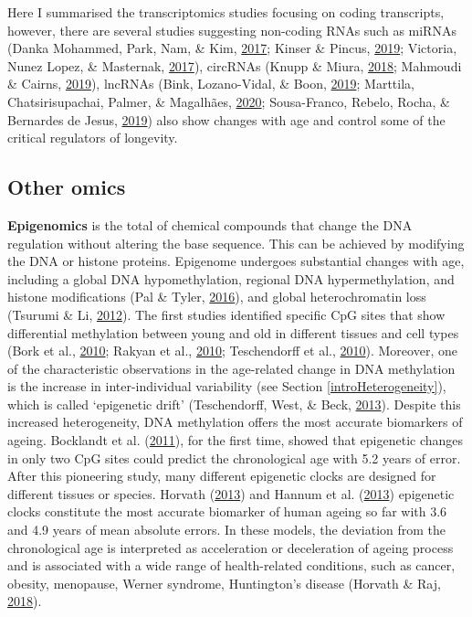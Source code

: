 \documentclass[12pt,twoside]{unicam}
\begin{document}
Here I summarised the transcriptomics studies focusing on coding transcripts, however, there are several studies suggesting non-coding RNAs such as miRNAs (Danka Mohammed, Park, Nam, \& Kim, \protect\hyperlink{ref-DankaMohammed2017}{2017}; Kinser \& Pincus, \protect\hyperlink{ref-Kinser2019}{2019}; Victoria, Nunez Lopez, \& Masternak, \protect\hyperlink{ref-Victoria2017}{2017}), circRNAs (Knupp \& Miura, \protect\hyperlink{ref-Knupp2018}{2018}; Mahmoudi \& Cairns, \protect\hyperlink{ref-Mahmoudi2019}{2019}), lncRNAs (Bink, Lozano-Vidal, \& Boon, \protect\hyperlink{ref-Bink2019}{2019}; Marttila, Chatsirisupachai, Palmer, \& Magalhães, \protect\hyperlink{ref-Marttila2020}{2020}; Sousa-Franco, Rebelo, Rocha, \& Bernardes de Jesus, \protect\hyperlink{ref-Sousa-Franco2019}{2019}) also show changes with age and control some of the critical regulators of longevity.

\hypertarget{introOtherOmics}{%
\subsection{Other omics}\label{introOtherOmics}}

\textbf{Epigenomics} is the total of chemical compounds that change the DNA regulation without altering the base sequence. This can be achieved by modifying the DNA or histone proteins. Epigenome undergoes substantial changes with age, including a global DNA hypomethylation, regional DNA hypermethylation, and histone modifications (Pal \& Tyler, \protect\hyperlink{ref-Pal2016}{2016}), and global heterochromatin loss (Tsurumi \& Li, \protect\hyperlink{ref-Tsurumi2012}{2012}). The first studies identified specific CpG sites that show differential methylation between young and old in different tissues and cell types (Bork et al., \protect\hyperlink{ref-Bork2010}{2010}; Rakyan et al., \protect\hyperlink{ref-Rakyan2010}{2010}; Teschendorff et al., \protect\hyperlink{ref-Teschendorff2010}{2010}). Moreover, one of the characteristic observations in the age-related change in DNA methylation is the increase in inter-individual variability (see Section \ref{introHeterogeneity}), which is called `epigenetic drift' (Teschendorff, West, \& Beck, \protect\hyperlink{ref-Teschendorff2013}{2013}). Despite this increased heterogeneity, DNA methylation offers the most accurate biomarkers of ageing. Bocklandt et al. (\protect\hyperlink{ref-Bocklandt2011}{2011}), for the first time, showed that epigenetic changes in only two CpG sites could predict the chronological age with 5.2 years of error. After this pioneering study, many different epigenetic clocks are designed for different tissues or species. Horvath (\protect\hyperlink{ref-Horvath2013}{2013}) and Hannum et al. (\protect\hyperlink{ref-Hannum2013}{2013}) epigenetic clocks constitute the most accurate biomarker of human ageing so far with 3.6 and 4.9 years of mean absolute errors. In these models, the deviation from the chronological age is interpreted as acceleration or deceleration of ageing process and is associated with a wide range of health-related conditions, such as cancer, obesity, menopause, Werner syndrome, Huntington's disease (Horvath \& Raj, \protect\hyperlink{ref-Horvath2018}{2018}).
\end{document}
